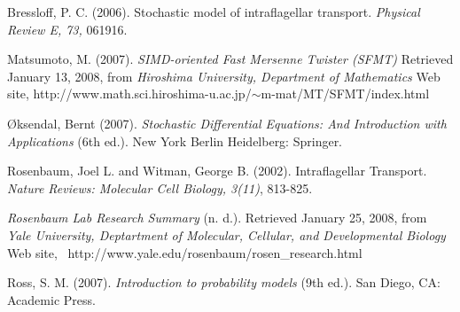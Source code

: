 \begin{thebibliography}{99}
\raggedright

Bressloff, P. C. (2006).
Stochastic model of intraflagellar transport.
\emph{Physical Review E, 73,} 061916.

Matsumoto, M. (2007).
\emph{SIMD-oriented Fast Mersenne Twister (SFMT)}
Retrieved January 13, 2008, from 
\emph{Hiroshima University, Department of Mathematics} Web site, 
http://www.math.sci.hiroshima-u.ac.jp/$\sim$m-mat/MT/SFMT/index.html

{\O}ksendal, Bernt (2007).
\emph{Stochastic Differential Equations: And Introduction with Applications}
(6th ed.).
New York Berlin Heidelberg: Springer.

Rosenbaum, Joel L. and Witman, George B. (2002).
Intraflagellar Transport.
\emph{Nature Reviews: Molecular Cell Biology, 3(11)}, 813-825.

\emph{Rosenbaum Lab Research Summary} (n. d.).
Retrieved January 25, 2008, from
\emph{Yale University, Deptartment of Molecular, Cellular, and Developmental Biology} Web site,  \mbox{
http://www.yale.edu/rosenbaum/rosen\_research.html}

Ross, S. M. (2007).
\emph{Introduction to probability models} (9th ed.).
San Diego, CA: Academic Press.

\end{thebibliography}
